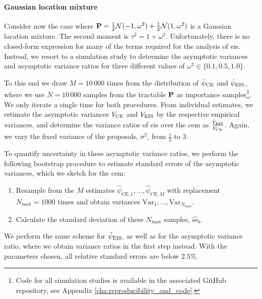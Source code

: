 \begin{example}
    \paragraph{Gaussian location mixture}
    Consider now the case where $\P = \frac{1}{2} \mathcal N(-1, \omega^{2}) + \frac{1}{2}\mathcal N(1, \omega^{2})$ is a Gaussian location mixture. The second moment is $\tau^{2} = 1 + \omega^{2}$. Unfortunately, there is no closed-form expression for many of the terms required for the analysis of \gls{eis}. Instead, we resort to a simulation study to determine the asymptotic variances and asymptotic variance ratios for three different values of $\omega^{2} \in \{0.1, 0.5, 1.0\}$. 
    
    To this end we draw $M = 10\,000$ times from the distribution of $\hpce$ and $\hpeis$, where we use $N=10\,000$ samples from the tractable $\P$ as importance samples\footnote{Code for all simulation studies is available in the associated GitHub repository, see Appendix \ref{cha:reproducibility_and_code}.}. We only iterate a single time for both procedures. From individual estimates, we estimate the asymptotic variances $V_{\ce}$ and $V_{\eis}$ by the respective empirical variances, and determine the variance ratios of \gls{eis} over the \gls{cem} as $ \frac{\hat V_{\eis}}{\hat V_{\ce}}$. Again, we vary the fixed variance of the proposals, $\sigma^{2}$, from $\frac{1}{2}$ to $3$. 

    To quantify uncertainty in these asymptotic variance ratios, we perform the following bootstrap procedure to estimate standard errors of the asymptotic variances, which we sketch for the \acrshort{cem}: 
    \begin{enumerate}
        \item Resample from the $M$ estimates $\hat\psi_{\text{CE}, 1}, \dots, \hat\psi_{\text{CE}, M}$  with replacement $N_{\text{boot}} = 1000$ times and obtain variances $\text{Var}_{1}, \dots, \text{Var}_{N_{\text{boot}}}$.
        \item Calculate the standard deviation of these $N_{\text{boot}}$ samples, $\widehat{\text{se}}_{b}$. 
    \end{enumerate}

    We perform the same scheme for $\hpeis$, as well as for the asymptotic variance ratio, where we obtain variance ratios in the first step instead. With the parameters chosen, all relative standard errors are below $2.5\%$. 
    

\end{example}
